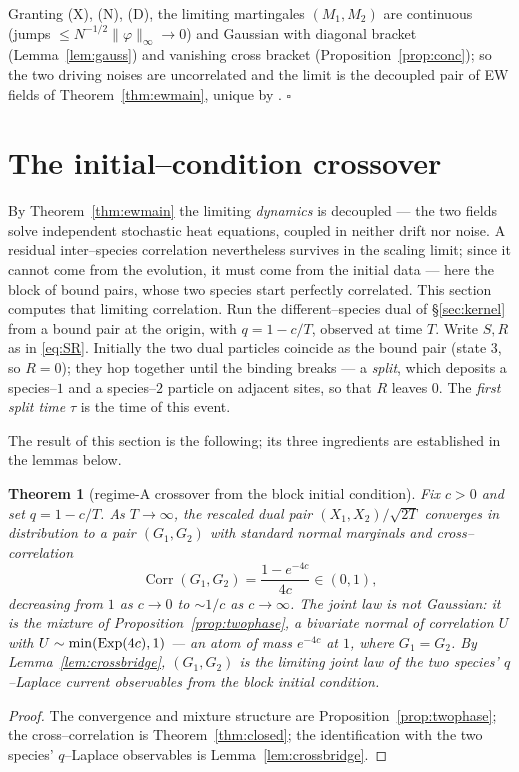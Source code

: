 \documentclass[11pt]{article}
\theoremstyle{plain}
\newtheorem{theorem}{Theorem}[section]
\theoremstyle{definition}
\theoremstyle{remark}
\DeclareMathOperator{\Corr}{Corr}\DeclareMathOperator{\cum}{cum}
\begin{document}
\noindent Granting (X), (N), (D), the limiting martingales $(M_1,M_2)$ are continuous
(jumps $\le N^{-1/2}\|\varphi\|_\infty\to0$) and Gaussian with diagonal bracket
(Lemma~\ref{lem:gauss}) and vanishing cross bracket (Proposition~\ref{prop:conc}); so
the two driving noises are uncorrelated and the limit is the decoupled pair of EW
fields of Theorem~\ref{thm:ewmain}, unique by \cite[Ch.~11]{KL}. \hfill$\square$

\section{The initial--condition crossover}\label{sec:cross}

By Theorem~\ref{thm:ewmain} the limiting \emph{dynamics} is decoupled --- the two fields
solve independent stochastic heat equations, coupled in neither drift nor noise. A
residual inter--species correlation nevertheless survives in the scaling limit; since it
cannot come from the evolution, it must come from the initial data --- here the block of
bound pairs, whose two species start perfectly correlated. This section computes that
limiting correlation. Run the different--species dual of \S\ref{sec:kernel} from a bound pair at
the origin, with $q=1-c/T$, observed at time $T$. Write $S,R$ as in \eqref{eq:SR}.
Initially the two dual particles coincide as the bound pair (state $3$, so $R=0$); they
hop together until the binding breaks --- a \emph{split}, which deposits a species--$1$
and a species--$2$ particle on adjacent sites, so that $R$ leaves $0$. The \emph{first
split time} $\tau$ is the time of this event.

The result of this section is the following; its three ingredients are established in the
lemmas below.

\begin{theorem}[regime-A crossover from the block initial condition]\label{thm:cross}
Fix $c>0$ and set $q=1-c/T$. As $T\to\infty$, the rescaled dual pair $(X_1,X_2)/\sqrt{2T}$
converges in distribution to a pair $(G_1,G_2)$ with standard normal marginals and
cross--correlation
\[
  \Corr(G_1,G_2)=\frac{1-e^{-4c}}{4c}\in(0,1),
\]
decreasing from $1$ as $c\to0$ to $\sim1/c$ as $c\to\infty$. The joint law is \emph{not}
Gaussian: it is the mixture of Proposition~\ref{prop:twophase}, a bivariate normal of
correlation $U$ with $U\sim\min(\mathrm{Exp}(4c),1)$ --- an atom of mass $e^{-4c}$ at $1$, where
$G_1=G_2$. By Lemma~\ref{lem:crossbridge}, $(G_1,G_2)$ is the limiting joint law of the
two species' $q$--Laplace current observables from the block initial condition.
\end{theorem}
\begin{proof}
The convergence and mixture structure are Proposition~\ref{prop:twophase}; the
cross--correlation is Theorem~\ref{thm:closed}; the identification with the two species'
$q$--Laplace observables is Lemma~\ref{lem:crossbridge}.
\end{proof}
\end{document}

